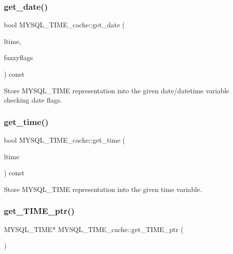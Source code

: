 \subsubsection{\texorpdfstring{get\+\_\+date()}{get\_date()}}
{\footnotesize\ttfamily bool M\+Y\+S\+Q\+L\+\_\+\+T\+I\+M\+E\+\_\+cache\+::get\+\_\+date (\begin{DoxyParamCaption}\item[{M\+Y\+S\+Q\+L\+\_\+\+T\+I\+ME $\ast$}]{ltime,  }\item[{uint}]{fuzzyflags }\end{DoxyParamCaption}) const}

Store M\+Y\+S\+Q\+L\+\_\+\+T\+I\+ME representation into the given date/datetime variable checking date flags. \mbox{\label{classMYSQL__TIME__cache_a1b68df1e56c5afae6876df13c1f673d8}} 
\subsubsection{\texorpdfstring{get\+\_\+time()}{get\_time()}}
{\footnotesize\ttfamily bool M\+Y\+S\+Q\+L\+\_\+\+T\+I\+M\+E\+\_\+cache\+::get\+\_\+time (\begin{DoxyParamCaption}\item[{M\+Y\+S\+Q\+L\+\_\+\+T\+I\+ME $\ast$}]{ltime }\end{DoxyParamCaption}) const\hspace{0.3cm}{\ttfamily [inline]}}

Store M\+Y\+S\+Q\+L\+\_\+\+T\+I\+ME representation into the given time variable. \mbox{\label{classMYSQL__TIME__cache_a85477e5e44e11713a5943b02ea51bc3d}} 
\subsubsection{\texorpdfstring{get\+\_\+\+T\+I\+M\+E\+\_\+ptr()}{get\_TIME\_ptr()}}
{\footnotesize\ttfamily M\+Y\+S\+Q\+L\+\_\+\+T\+I\+ME$\ast$ M\+Y\+S\+Q\+L\+\_\+\+T\+I\+M\+E\+\_\+cache\+::get\+\_\+\+T\+I\+M\+E\+\_\+ptr (\begin{DoxyParamCaption}{ }\end{DoxyParamCaption})\hspace{0.3cm}{\ttfamily [inline]}}

